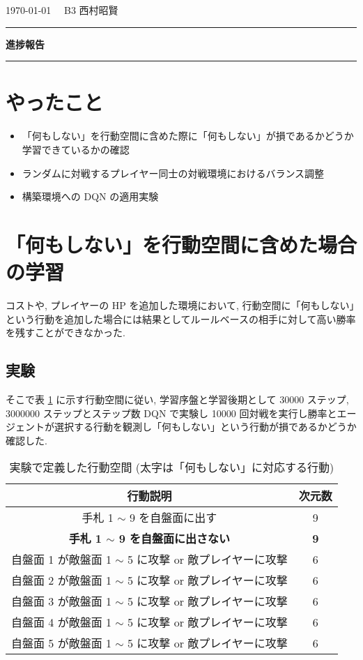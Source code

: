 \documentclass{jarticle}     %
\begin{document}
  \noindent
  \onecolumn
  \hspace{1em}

  \today
  \hfill
  \ \ B3 西村昭賢 

  \vspace{2mm}
  \hrule
  \begin{center}
  {\Large \bf 進捗報告}
  \end{center}
  \hrule
  \vspace{3mm}


\section{やったこと}
\begin{itemize}
  \item 「何もしない」を行動空間に含めた際に「何もしない」が損であるかどうか学習できているかの確認
  \item ランダムに対戦するプレイヤー同士の対戦環境におけるバランス調整
  \item 構築環境への DQN の適用実験
\end{itemize}

\section{「何もしない」を行動空間に含めた場合の学習}
コストや, プレイヤーの HP を追加した環境において, 行動空間に「何もしない」という行動を追加した場合には結果としてルールベースの相手に対して高い勝率を残すことができなかった. 
\subsection{実験}
そこで表 \ref{table:action2} に示す行動空間に従い, 学習序盤と学習後期として 30000 ステップ, 3000000 ステップとステップ数 DQN で実験し 10000 回対戦を実行し勝率とエージェントが選択する行動を観測し「何もしない」という行動が損であるかどうか確認した. 


\begin{table}[ht]
  \centering
  \caption{実験で定義した行動空間 (太字は「何もしない」に対応する行動)}
  \vspace{-0.3cm}
  \label{table:action2}
  \begin{tabular}{|c|c|}
  \hline
  行動説明                          & 次元数        \\ \hline
  手札 1 $\sim$ 9 を自盤面に出す             & 9          \\ \hline
  \textbf{手札 1 $\sim$ 9 を自盤面に出さない} & \textbf{9} \\ \hline
  自盤面 1 が敵盤面 1 $\sim$ 5 に攻撃 or 敵プレイヤーに攻撃    &  6          \\ \hline
  自盤面 2 が敵盤面 1 $\sim$ 5 に攻撃 or 敵プレイヤーに攻撃    & 6   \\ \hline
  自盤面 3 が敵盤面 1 $\sim$ 5 に攻撃 or 敵プレイヤーに攻撃    & 6 \\ \hline
  自盤面 4 が敵盤面 1 $\sim$ 5 に攻撃 or 敵プレイヤーに攻撃    & 6 \\ \hline
  自盤面 5 が敵盤面 1 $\sim$ 5 に攻撃 or 敵プレイヤーに攻撃    & 6 \\ \hline
  \end{tabular}
  \end{table}
\end{document}
